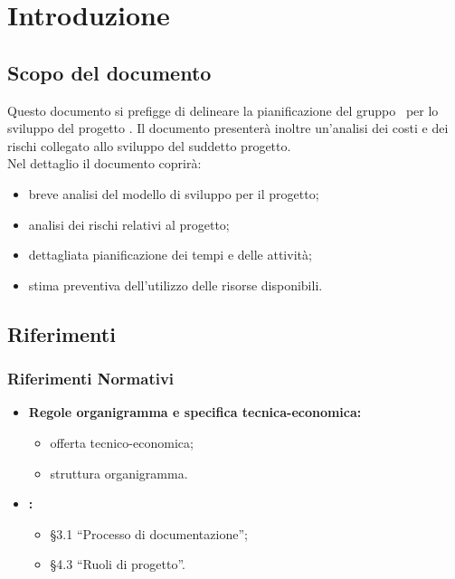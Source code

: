 \documentclass[PianoDiProgetto.tex]{subfiles}
\begin{document}
\chapter{Introduzione}

\section{Scopo del documento}
Questo documento si prefigge di delineare la pianificazione del gruppo \gruppo\ per lo sviluppo del progetto \progetto. Il documento presenterà inoltre un'analisi dei costi e dei rischi collegato allo sviluppo del suddetto progetto.\\
Nel dettaglio il documento coprirà:
\begin{itemize}
	\item breve analisi del modello di sviluppo per il progetto;
	\item analisi dei rischi relativi al progetto;
	\item dettagliata pianificazione dei tempi e delle attività;
	\item stima preventiva dell'utilizzo delle risorse disponibili.
\end{itemize}

\scopoProdotto

\glossExpl
\section{Riferimenti}
\subsection{Riferimenti Normativi}
\begin{itemize}
	\item \textbf{Regole organigramma e specifica tecnica-economica:} \\
		  \begin{itemize}
		  	\item offerta tecnico-economica;
		  	\item struttura organigramma.
		  \end{itemize}
	  \item \textbf{\normediprogetto \vruno:}
	  \begin{itemize}
	  	\item \S3.1 ``Processo di documentazione'';
	  	\item \S4.3 ``Ruoli di progetto''.
	  \end{itemize}
	
\end{itemize}
\end{document}
